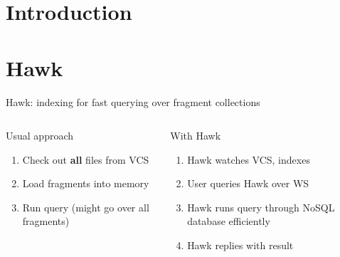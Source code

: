 



\maketitle

\section{Introduction}

\section{Hawk}

\begin{frame}{Hawk: indexing for fast querying over fragment collections}
  \centering

  \begin{columns}[t]
    \centering
    \begin{block}{Usual approach}
      \begin{enumerate}
      \item Check out \textbf{all} files from VCS
      \item Load fragments into memory
      \item Run query (might go over all fragments)
      \end{enumerate}
    \end{block}

    \centering
    \begin{block}{With Hawk}
      \begin{enumerate}
      \item Hawk watches VCS, indexes
      \item User queries Hawk over WS
      \item Hawk runs query through NoSQL database efficiently
      \item Hawk replies with result
      \end{enumerate}
    \end{block}

  \end{columns}

\end{frame}

